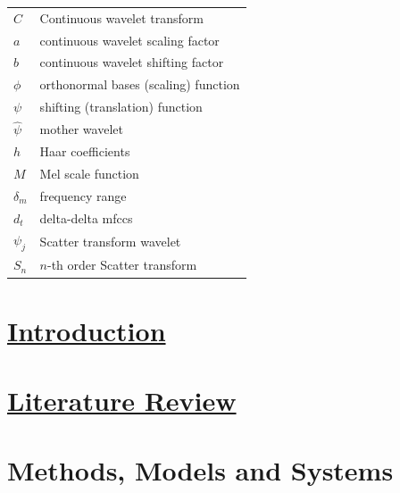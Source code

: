 \documentclass[12pt,twoside]{report}
\begin{document}
\begin{table}[tp]
\begin{tabular}{ll}
$C$ & Continuous wavelet transform \\
$a$ & continuous wavelet scaling factor \\
$b$ & continuous wavelet shifting factor \\
$\phi$ & orthonormal bases (scaling) function \\
$\psi$ & shifting (translation) function \\
$\hat{\psi}$ & mother wavelet \\
$h$ & Haar coefficients \\
$M$ & Mel scale function \\
$\delta_m$ & frequency range \\
$d_t$ & delta-delta \acrshort{mfcc}s \\
$\psi_j$ & Scatter transform wavelet \\
$S_n$ & $n$-th order Scatter transform \\
\end{tabular}
\end{table}
\stopblue

\chapter{\href{https://docs.google.com/document/d/1h8ZEcfEUpjJM6wYkgYYH-ryuiBFYVGSQA-Sf1StQtiY/edit#heading=h.i9tlo6ovvcpr}{Introduction}}\label{ch1_intro}


\chapter{\href{https://docs.google.com/document/d/1h8ZEcfEUpjJM6wYkgYYH-ryuiBFYVGSQA-Sf1StQtiY/edit#heading=h.i9tlo6ovvcpr}{Literature Review}}\label{c02}\label{ch2litrev}


\chapter{Methods, Models and Systems}\label{ch3Method}


\end{document}
